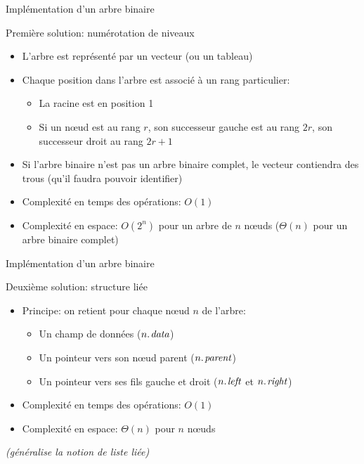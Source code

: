 \begin{frame}{Implémentation d'un arbre binaire}

Première solution: \alert{numérotation de niveaux}
\begin{itemize}
\item L'arbre est représenté par un vecteur (ou un tableau)
\item Chaque position dans l'arbre est associé à un rang particulier:
\begin{itemize}
\item La racine est en position 1
\item Si un n\oe ud est au rang $r$, son successeur gauche est au rang $2r$, son successeur droit au rang $2r+1$
\end{itemize}
\item Si l'arbre binaire n'est pas un arbre binaire complet, le vecteur contiendra des trous (qu'il faudra pouvoir identifier)
\item Complexité en temps des opérations: $O(1)$
\item Complexité en espace: $O(2^n)$ pour un arbre de $n$ n\oe uds ($\Theta(n)$ pour un arbre binaire complet)
\end{itemize}


\end{frame}

\begin{frame}{Implémentation d'un arbre binaire}

Deuxième solution: \alert{structure liée}
\begin{itemize}
\item Principe: on retient pour chaque n\oe ud $n$ de l'arbre:
\begin{itemize}
\item Un champ de données ($\attrib{n}{data}$)
\item Un pointeur vers son n\oe ud parent ($\attrib{n}{parent}$)
\item Un pointeur vers ses fils gauche et droit ($\attrib{n}{left}$ et $\attrib{n}{right}$)
\end{itemize}
\item Complexité en temps des opérations: $O(1)$
\item Complexité en espace: $\Theta(n)$ pour $n$ n\oe uds
\end{itemize}

\bigskip

{\it (généralise la notion de liste liée)}
\end{frame}


